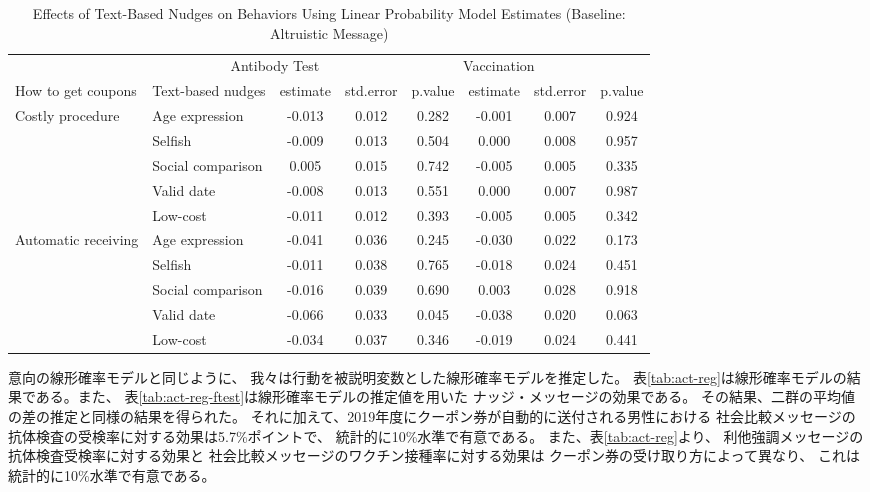 \documentclass[
  11pt,
  a4paper,
]{article}
\begin{document}
\begin{table}

\caption{\label{tab:act-reg-ftest2}Effects of Text-Based Nudges on Behaviors Using Linear Probability Model Estimates (Baseline: Altruistic Message)}
\centering
\begin{tabular}[t]{>{\raggedright\arraybackslash}p{5em}lcccccc}
\toprule
\multicolumn{2}{c}{ } & \multicolumn{3}{c}{Antibody Test} & \multicolumn{3}{c}{Vaccination} \\
\cmidrule(l{3pt}r{3pt}){3-5} \cmidrule(l{3pt}r{3pt}){6-8}
How to get coupons & Text-based nudges & estimate & std.error & p.value & estimate  & std.error  & p.value \\
\midrule
Costly procedure & Age expression & -0.013 & 0.012 & 0.282 & -0.001 & 0.007 & 0.924\\
 & Selfish & -0.009 & 0.013 & 0.504 & 0.000 & 0.008 & 0.957\\
 & Social comparison & 0.005 & 0.015 & 0.742 & -0.005 & 0.005 & 0.335\\
 & Valid date & -0.008 & 0.013 & 0.551 & 0.000 & 0.007 & 0.987\\
 & Low-cost & -0.011 & 0.012 & 0.393 & -0.005 & 0.005 & 0.342\\
Automatic receiving & Age expression & -0.041 & 0.036 & 0.245 & -0.030 & 0.022 & 0.173\\
 & Selfish & -0.011 & 0.038 & 0.765 & -0.018 & 0.024 & 0.451\\
 & Social comparison & -0.016 & 0.039 & 0.690 & 0.003 & 0.028 & 0.918\\
 & Valid date & -0.066 & 0.033 & 0.045 & -0.038 & 0.020 & 0.063\\
 & Low-cost & -0.034 & 0.037 & 0.346 & -0.019 & 0.024 & 0.441\\
\bottomrule
\end{tabular}
\end{table}

意向の線形確率モデルと同じように、
我々は行動を被説明変数とした線形確率モデルを推定した。
表\ref{tab:act-reg}は線形確率モデルの結果である。また、
表\ref{tab:act-reg-ftest}は線形確率モデルの推定値を用いた
ナッジ・メッセージの効果である。
その結果、二群の平均値の差の推定と同様の結果を得られた。
それに加えて、2019年度にクーポン券が自動的に送付される男性における
社会比較メッセージの抗体検査の受検率に対する効果は5.7\%ポイントで、
統計的に10\%水準で有意である。
また、表\ref{tab:act-reg}より、
利他強調メッセージの抗体検査受検率に対する効果と
社会比較メッセージのワクチン接種率に対する効果は
クーポン券の受け取り方によって異なり、
これは統計的に10\%水準で有意である。
\end{document}
